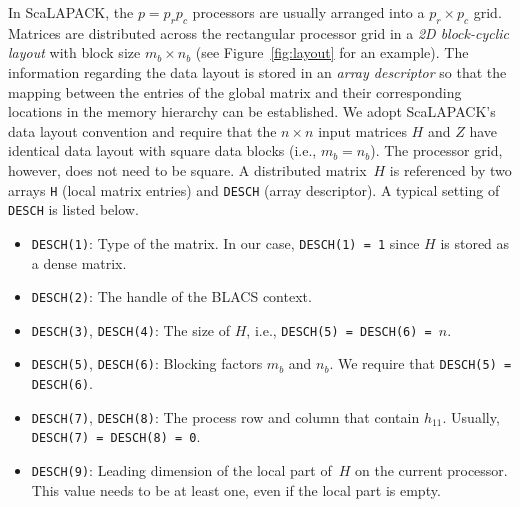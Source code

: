 \documentclass{article}
\begin{document}
In ScaLAPACK, the $p=p_rp_c$ processors are usually arranged into a
$p_r\times p_c$ grid.
Matrices are distributed across the rectangular processor grid in a \emph{2D
block-cyclic layout} with block size $m_b\times n_b$ (see Figure~\ref{fig:layout} for an example).
The information regarding the data layout is stored in an \emph{array
descriptor} so that the mapping between the entries of the global matrix and their
corresponding locations in the memory hierarchy can be established.
We adopt ScaLAPACK's data layout convention and require that the $n\times
n$ input matrices $H$ and $Z$ have identical data layout with square data
blocks (i.e., $m_b=n_b$). The processor grid, however, does not need to be square.
A distributed matrix~$H$ is referenced by two arrays
\texttt{H} (local matrix entries) and \texttt{DESCH} (array descriptor).
A typical setting of \texttt{DESCH} is listed below.
\begin{itemize}
\item \texttt{DESCH(1)}:
Type of the matrix.
In our case, \texttt{DESCH(1) = 1} since $H$ is stored as a dense matrix.
\item \texttt{DESCH(2)}:
The handle of the BLACS context.
\item \texttt{DESCH(3)}, \texttt{DESCH(4)}:
The size of $H$, i.e., \texttt{DESCH(5) = DESCH(6) = }$n$.
\item \texttt{DESCH(5)}, \texttt{DESCH(6)}:
Blocking factors $m_b$ and $n_b$.
We require that \texttt{DESCH(5) = DESCH(6)}.
\item \texttt{DESCH(7)}, \texttt{DESCH(8)}:
The process row and column that contain $h_{11}$.
Usually, \texttt{DESCH(7) = DESCH(8) = 0}.
\item \texttt{DESCH(9)}:
Leading dimension of the local part of~$H$ on the current processor.
This value needs to be at least one, even if the local part is empty.
\end{itemize}
\end{document}
